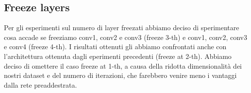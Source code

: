 \documentclass[10pt,twocolumn,letterpaper]{article}
\begin{document}



\subsection{Freeze layers}
Per gli esperimenti sul numero di layer freezati abbiamo deciso di sperimentare cosa accade se freeziamo conv1, conv2 e conv3 (freeze 3-th) e conv1, conv2, conv3 e conv4 (freeze 4-th). I risultati ottenuti gli abbiamo confrontati anche con l'architettura ottenuta dagli eperimenti precedenti (freeze at 2-th). Abbiamo deciso di omettere il caso freeze at 1-th, a causa della ridotta dimensionalit\`a dei nostri dataset e del numero di iterazioni, che farebbero venire meno i vantaggi dalla rete preaddestrata.
\end{document}

